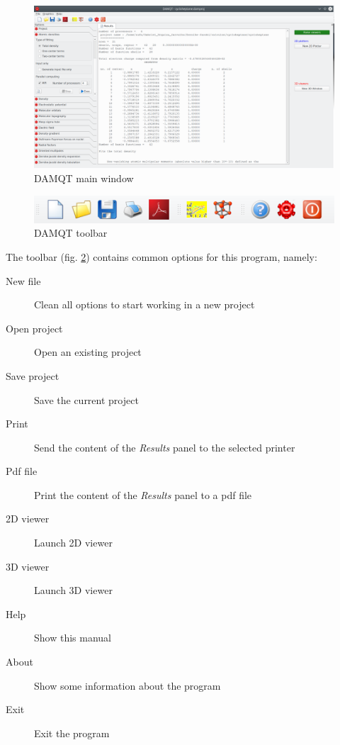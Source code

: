 \documentclass[10pt]{article}
\begin{document}
\vspace*{0cm}
\begin{figure}[H]
\begin{center}
\includegraphics[width=0.5\linewidth]{damqt320_main_panel.png}
\end{center}
\caption{{DAMQT} main window \label{fig:2_1}}
\end{figure}

\vspace*{0cm}
\begin{figure}[H]
\begin{center}
\includegraphics[width=0.5\linewidth]{damqt320_toolbar.png}
\end{center}
\caption{{DAMQT} toolbar \label{fig:2_2}}
\end{figure}

The toolbar (fig. \ref{fig:2_2}) contains common options for this
program, namely:


\begin{description}
 \item[\bigtoolbN New file] Clean all options to start working in a new project
 \item[\bigtoolbA Open project] Open an existing  project
 \item[\bigtoolbS Save project] Save the current project
 \item[\bigtoolbP Print] Send the content of the {\it Results} panel to the
selected printer
 \item[\bigtoolbD Pdf file] Print the content of the {\it Results} panel to a pdf
file
 \item[\bigtoolbC 2D viewer] Launch 2D viewer
 \item[\bigtoolbV 3D viewer] Launch 3D viewer
 \item[\bigtoolbH Help] Show this manual
 \item[\bigtoolbB About] Show some information about the program
 \item[\bigtoolbQ Exit] Exit the program
\end{description} 
\end{document}
